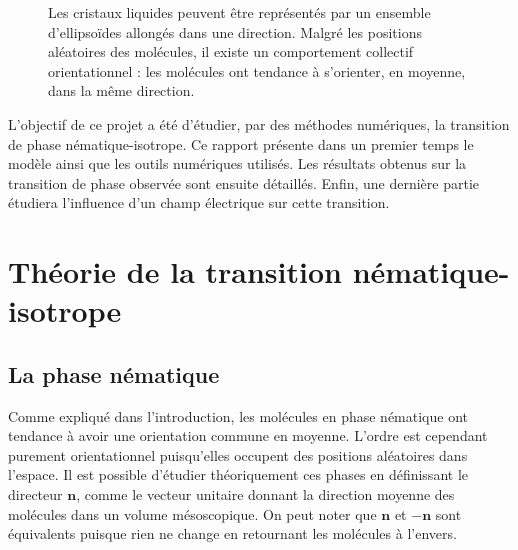 \documentclass[11pt,a4paper]{article}
\numberwithin{equation}{section}
\begin{document}
\begin{figure}[h]
    \center
    
    \caption{Les cristaux liquides peuvent être représentés par un ensemble d'ellipsoïdes allongés dans une direction.
    Malgré les positions aléatoires des molécules, il existe un comportement collectif orientationnel : les molécules ont tendance à s'orienter, en moyenne, dans la même direction. }
    \label{nematic_phase}
\end{figure}

L'objectif de ce projet a été d'étudier, par des méthodes numériques, la transition de phase nématique-isotrope. Ce rapport présente dans un premier temps le modèle ainsi que les outils numériques utilisés. Les résultats obtenus sur la transition de phase observée sont ensuite détaillés. Enfin, une dernière partie étudiera l'influence d'un champ électrique sur cette transition.

\newpage
\section{Théorie de la transition nématique-isotrope}
\subsection{La phase nématique}
Comme expliqué dans l'introduction, les molécules en phase nématique ont tendance à avoir une orientation commune en moyenne. L'ordre est cependant purement orientationnel puisqu'elles occupent des positions aléatoires dans l'espace. Il est possible d’étudier théoriquement ces phases en définissant le directeur $\bm{n}$, comme le vecteur unitaire donnant la direction moyenne des molécules dans un volume mésoscopique. On peut noter que $\bm{n}$ et $-\bm{n}$ sont équivalents puisque rien ne change en retournant les molécules à l'envers.
\medskip
\end{document}
